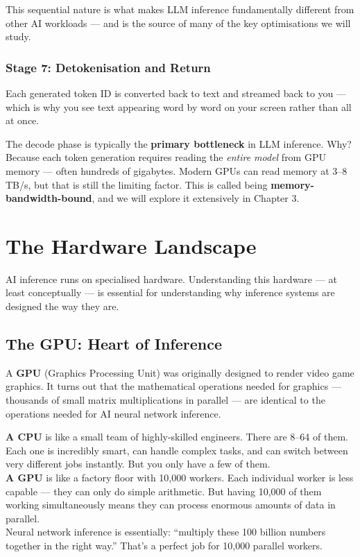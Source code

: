 \documentclass[12pt, twoside, openright]{book}
\newcommand{\term}[1]{\textbf{\color{chaptercolor}#1}}
\begin{document}
This sequential nature is what makes LLM inference fundamentally
different from other AI workloads --- and is the source of many of
the key optimisations we will study.

\subsubsection{Stage 7: Detokenisation and Return}
Each generated token ID is converted back to text and streamed back
to you --- which is why you see text appearing word by word on your
screen rather than all at once.

\begin{insightbox}
The decode phase is typically the \textbf{primary bottleneck} in
LLM inference. Why? Because each token generation requires reading
the \textit{entire model} from GPU memory --- often hundreds of
gigabytes. Modern GPUs can read memory at 3--8 TB/s, but that is
still the limiting factor. This is called being
\textbf{memory-bandwidth-bound}, and we will explore it extensively
in Chapter 3.
\end{insightbox}

\section{The Hardware Landscape}

AI inference runs on specialised hardware. Understanding this hardware
--- at least conceptually --- is essential for understanding why
inference systems are designed the way they are.

\subsection{The GPU: Heart of Inference}

A \term{GPU} (Graphics Processing Unit) was originally designed to
render video game graphics. It turns out that the mathematical
operations needed for graphics --- thousands of small matrix
multiplications in parallel --- are identical to the operations
needed for AI neural network inference.

\begin{analogybox}
\textbf{A CPU} is like a small team of highly-skilled engineers.
There are 8--64 of them. Each one is incredibly smart, can handle
complex tasks, and can switch between very different jobs instantly.
But you only have a few of them.\\[6pt]
\textbf{A GPU} is like a factory floor with 10,000 workers.
Each individual worker is less capable --- they can only do simple
arithmetic. But having 10,000 of them working simultaneously means
they can process enormous amounts of data in parallel.\\[6pt]
Neural network inference is essentially: ``multiply these 100 billion
numbers together in the right way.'' That's a perfect job for 10,000
parallel workers.
\end{analogybox}
\end{document}
